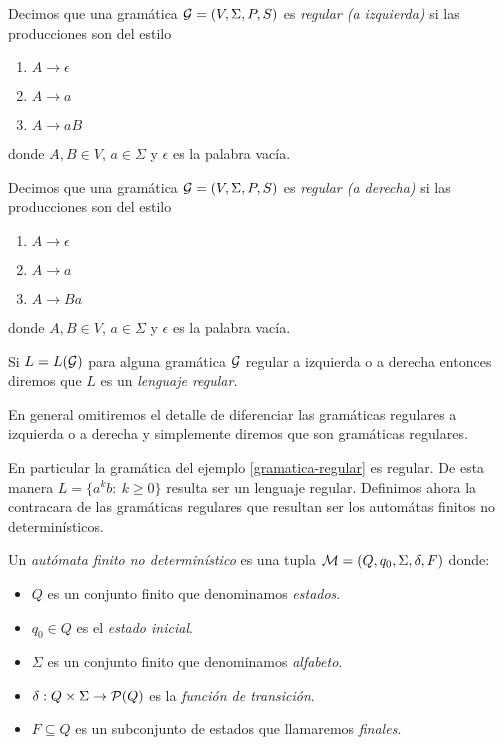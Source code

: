\documentclass[tesis.tex]{subfiles}
\begin{document}
\begin{deff}
	Decimos que una gramática ${\cal G} = (V, \Sigma, P, S)$ es \emph{regular (a izquierda)} si las producciones son del estilo
	\begin{enumerate}
		\item $A \to \epsilon$
		\item $A \to a$
		\item $A \to a B$
	\end{enumerate}
	donde $A, B \in V$, $a \in \Sigma$ y $\epsilon$ es la palabra vacía. 

	Decimos que una gramática ${\cal G} = (V, \Sigma, P, S)$ es \emph{regular (a derecha)} si las producciones son del estilo
	\begin{enumerate}
		\item $A \to \epsilon$
		\item $A \to a$
		\item $A \to Ba$
	\end{enumerate}
	donde $A, B \in V$, $a \in \Sigma$ y $\epsilon$ es la palabra vacía. 

	Si $L=L({\cal G})$ para alguna gramática $\cal G$  regular a izquierda o a derecha entonces diremos que $L$ es un \emph{lenguaje regular}. 
\end{deff}

En general omitiremos el detalle de diferenciar las gramáticas regulares a izquierda o a derecha y simplemente diremos que son gramáticas regulares.


En particular la gramática del ejemplo \ref{gramatica-regular} es regular. 
De esta manera $L = \{ a^k b : \ k \ge 0  \}$ resulta ser un lenguaje regular.
Definimos ahora la contracara de las gramáticas regulares que resultan ser los automátas finitos no determinísticos.

\begin{deff}
	Un \emph{autómata finito no determinístico} es una tupla ${\cal M} = (Q,q_0,\Sigma,\delta,F)$ donde:
	\begin{itemize}
		\item $Q$ es un conjunto finito que denominamos \emph{estados}.
		\item $q_0 \in Q$ es el \emph{estado inicial}.
		\item $\Sigma$ es un conjunto finito que denominamos \emph{alfabeto}.
		\item $\delta:Q \times \Sigma \to {\cal P}(Q)$ es la \emph{función de transición}.
		\item $F \subseteq Q$ es un subconjunto de estados que llamaremos \emph{finales}.
	\end{itemize}
\end{deff}
\end{document}
